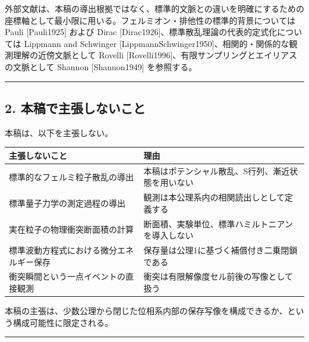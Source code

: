 \documentclass[
  a4paper,
]{article}
\newcounter{none} %
\begin{document}
外部文献は、本稿の導出根拠ではなく、標準的文脈との違いを明確にするための座標軸として最小限に用いる。フェルミオン・排他性の標準的背景については
Pauli {[}Pauli1925{]} および Dirac
{[}Dirac1926{]}、標準散乱理論の代表的定式化については Lippmann and
Schwinger
{[}LippmannSchwinger1950{]}、相関的・関係的な観測理解の近傍文脈として
Rovelli {[}Rovelli1996{]}、有限サンプリングとエイリアスの文脈として
Shannon {[}Shannon1949{]} を参照する。

\begin{center}\rule{0.5\linewidth}{0.5pt}\end{center}

\subsection{2.
本稿で主張しないこと}\label{ux672cux7a3fux3067ux4e3bux5f35ux3057ux306aux3044ux3053ux3068}

本稿は、以下を主張しない。

{\def\LTcaptype{none} %
\begin{longtable}[]{@{}
  >{\raggedright\arraybackslash}p{}
  >{\raggedright\arraybackslash}p{}@{}}
\toprule\noalign{}
\begin{minipage}[b]{\linewidth}\raggedright
主張しないこと
\end{minipage} & \begin{minipage}[b]{\linewidth}\raggedright
理由
\end{minipage} \\
\midrule\noalign{}
\endhead
\bottomrule\noalign{}
\endlastfoot
標準的なフェルミ粒子散乱の導出 &
本稿はポテンシャル散乱、S行列、漸近状態を用いない \\
標準量子力学の測定過程の導出 &
観測は本公理系内の相関読出しとして定義する \\
実在粒子の物理衝突断面積の計算 &
断面積、実験単位、標準ハミルトニアンを導入しない \\
標準波動方程式における微分エネルギー保存 &
保存量は公理1に基づく補償付き二乗閉鎖である \\
衝突瞬間という一点イベントの直接観測 &
衝突は有限解像度セル前後の写像として扱う \\
\end{longtable}
}

本稿の主張は、少数公理から閉じた位相系内部の保存写像を構成できるか、という構成可能性に限定される。

\begin{center}\rule{0.5\linewidth}{0.5pt}\end{center}
\end{document}
